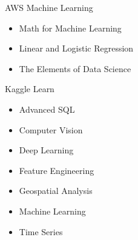 \vspace*{0.05 in}

\Development
{AWS Machine Learning}
{\begin{itemize}
    \item Math for Machine Learning
    \item Linear and Logistic Regression
    \item The Elements of Data Science
\end{itemize}}

\vspace*{0.05 in}

\Development
{Kaggle Learn}
{\begin{itemize}
    \item Advanced SQL
    \item Computer Vision
    \item Deep Learning
    \item Feature Engineering
    \item Geospatial Analysis
    \item Machine Learning
    \item Time Series
\end{itemize}}


